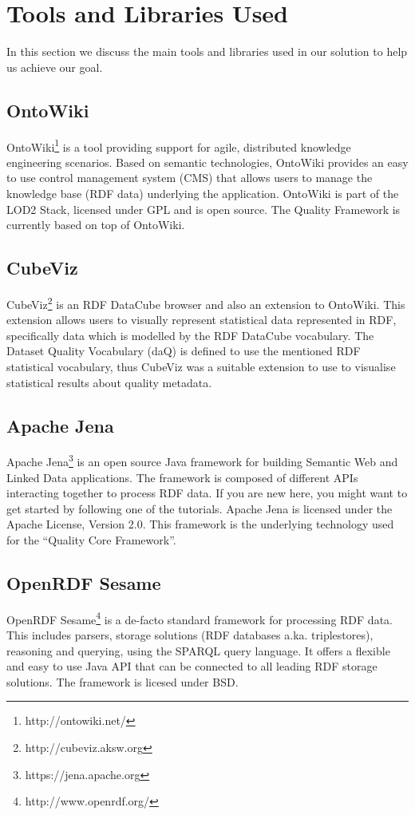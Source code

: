
\section{Tools and Libraries Used}
\label{sec:Libraries} 

In this section we discuss the main tools and libraries used in our solution to help us achieve our goal.

\subsection{OntoWiki}
\label{sec:OntoWiki}
OntoWiki\footnote{http://ontowiki.net/} is a tool providing support for agile, distributed knowledge engineering scenarios.
Based on semantic technologies, OntoWiki provides an easy to use control management system (CMS) that allows users to manage the knowledge base (RDF data) underlying the application.
OntoWiki is part of the LOD2 Stack, licensed under GPL and is open source.
The Quality Framework is currently based on top of OntoWiki.

\subsection{CubeViz}
\label{sec:CubeViz}
CubeViz\footnote{http://cubeviz.aksw.org} is an RDF DataCube browser and also an extension to OntoWiki.
This extension allows users to visually represent statistical data represented in RDF, specifically data which is modelled by the RDF DataCube vocabulary.
The Dataset Quality Vocabulary (daQ) is defined to use the mentioned RDF statistical vocabulary, thus CubeViz was a suitable extension to use to visualise statistical results about quality metadata.


\subsection{Apache Jena}
\label{sec:Jena}
Apache Jena\footnote{https://jena.apache.org} is an open source Java framework for building Semantic Web and Linked Data applications.
The framework is composed of different APIs interacting together to process RDF data. If you are new here, you might want to get started by following one of the tutorials.
Apache Jena is licensed under the Apache License, Version 2.0. 
This framework is the underlying technology used for the ``Quality Core Framework''.

\subsection{OpenRDF Sesame}
\label{sec:Sesame}
OpenRDF Sesame\footnote{http://www.openrdf.org/} is  a de-facto standard framework for processing RDF data. 
This includes parsers, storage solutions (RDF databases a.ka. triplestores), reasoning and querying, using the SPARQL query language. 
It offers a flexible and easy to use Java API that can be connected to all leading RDF storage solutions. 
The framework is licesed under BSD.


